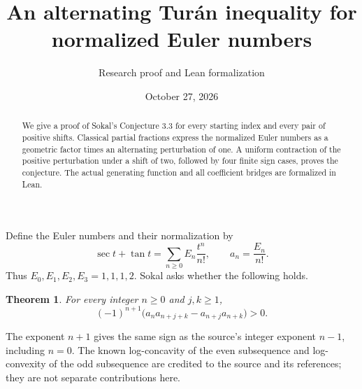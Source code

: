 \documentclass[11pt]{article}
\title{An alternating Tur\'an inequality for normalized Euler numbers}
\author{Research proof and Lean formalization}
\date{October 27, 2026}
\newtheorem{theorem}{Theorem}
\begin{document}
\maketitle
\begin{abstract}
We give a proof of Sokal's Conjecture 3.3 for every starting index and every pair of positive shifts. Classical partial fractions express the normalized Euler numbers as a geometric factor times an alternating perturbation of one. A uniform contraction of the positive perturbation under a shift of two, followed by four finite sign cases, proves the conjecture. The actual generating function and all coefficient bridges are formalized in Lean.
\end{abstract}

Define the Euler numbers and their normalization by
\[
 \sec t+\tan t=\sum_{n\geq0}E_n\frac{t^n}{n!},\qquad a_n=\frac{E_n}{n!}.
\]
Thus $E_0,E_1,E_2,E_3=1,1,1,2$. Sokal \cite[Conjecture 3.3, p.~14]{Sokal} asks whether the following holds.
\begin{theorem}\label{main}
For every integer $n\geq0$ and $j,k\geq1$,
\[
 (-1)^{n+1}\bigl(a_na_{n+j+k}-a_{n+j}a_{n+k}\bigr)>0.
\]
\end{theorem}
The exponent $n+1$ gives the same sign as the source's integer exponent $n-1$, including $n=0$. The known log-concavity of the even subsequence and log-convexity of the odd subsequence are credited to the source and its references; they are not separate contributions here.
\end{document}
